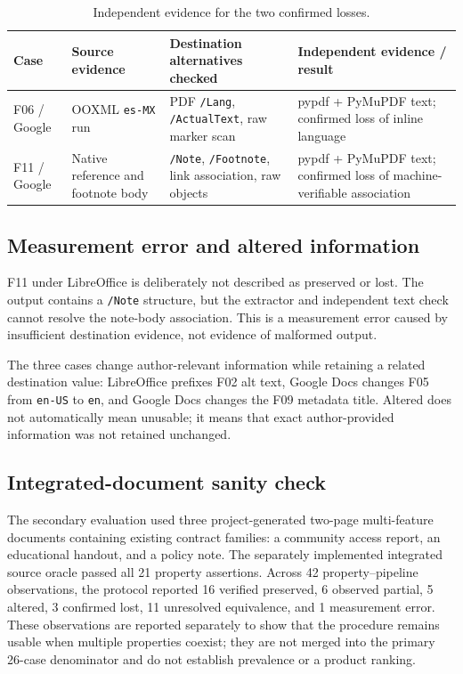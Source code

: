 \begin{table}[t]
\centering\scriptsize
\caption{Independent evidence for the two confirmed losses.}
\label{tab:losses}
\begin{tabular}{p{}p{}p{}p{}}
\hline
Case & Source evidence & Destination alternatives checked & Independent evidence / result \\
\hline
F06 / Google & OOXML \texttt{es-MX} run & PDF \texttt{/Lang}, \texttt{/ActualText}, raw marker scan & pypdf + PyMuPDF text; confirmed loss of inline language \\
F11 / Google & Native reference and footnote body & \texttt{/Note}, \texttt{/Footnote}, link association, raw objects & pypdf + PyMuPDF text; confirmed loss of machine-verifiable association \\
\hline
\end{tabular}
\end{table}

\subsection{Measurement error and altered information}

F11 under LibreOffice is deliberately not described as preserved or lost. The output contains a \texttt{/Note} structure, but the extractor and independent text check cannot resolve the note-body association. This is a measurement error caused by insufficient destination evidence, not evidence of malformed output.

The three \altered{} cases change author-relevant information while retaining a related destination value: LibreOffice prefixes F02 alt text, Google Docs changes F05 from \texttt{en-US} to \texttt{en}, and Google Docs changes the F09 metadata title. Altered does not automatically mean unusable; it means that exact author-provided information was not retained unchanged.

\subsection{Integrated-document sanity check}

The secondary evaluation used three project-generated two-page multi-feature documents containing existing contract families: a community access report, an educational handout, and a policy note. The separately implemented integrated source oracle passed all 21 property assertions. Across 42 property--pipeline observations, the protocol reported 16 verified preserved, 6 observed partial, 5 altered, 3 confirmed lost, 11 unresolved equivalence, and 1 measurement error. These observations are reported separately to show that the procedure remains usable when multiple properties coexist; they are not merged into the primary 26-case denominator and do not establish prevalence or a product ranking.


